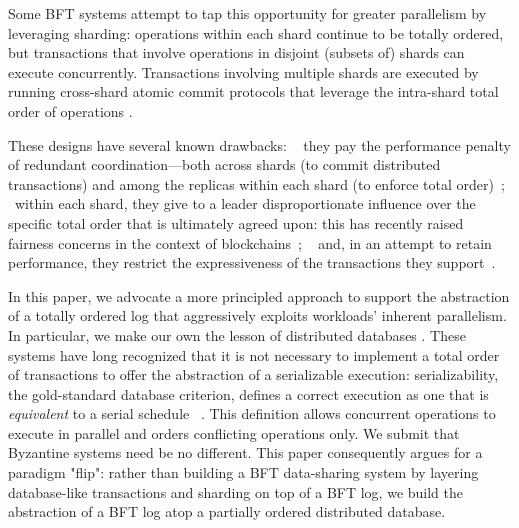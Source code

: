 Some BFT systems attempt to tap this opportunity for greater parallelism by leveraging sharding: operations within each shard continue to be totally ordered, but transactions that involve operations in disjoint (subsets of) shards can execute concurrently. Transactions involving  multiple shards are executed by running cross-shard atomic commit protocols that leverage the intra-shard total order of operations \cite{kokoris2018omniledger, al2017chainspace, zamani2018rapidchain, padilha2013augustus, padilha2016callinicos}. 

These designs have several known drawbacks: \one~ they pay the performance penalty of  redundant coordination---both across shards (to commit distributed transactions) and among the replicas within each shard (to enforce total order)~\cite{zhang2016operation, zhang2015tapir, mu2016consolidating}; \two~within each shard,  they give to a leader disproportionate influence over the specific total order that is ultimately agreed upon: this has recently raised fairness concerns in the context of blockchains~\cite{herlihy2016enhancing, yin2019hotstuff}; \three~ and, in an attempt to retain performance, they restrict the expressiveness of the transactions they support~\cite{padilha2013augustus, padilha2016callinicos}. 

In this paper, we advocate a more principled approach to support the abstraction of a totally ordered log that aggressively exploits workloads' inherent parallelism. In particular, we  make our own the lesson of distributed databases . These systems have long recognized that it is not necessary to implement a total order of transactions to offer the abstraction of a serializable execution: serializability, the gold-standard database criterion, defines a correct execution as one that is \textit{equivalent} to a serial schedule ~\cite{bernstein1979fas,Papadimitriou1979serializability,bernstein1979fas}.  This definition allows concurrent operations to execute in parallel and orders conflicting operations only.  We submit that Byzantine systems need be no different. This paper consequently argues for a paradigm "flip": rather than building a BFT data-sharing system by layering database-like transactions and sharding on top of a BFT log, we build the abstraction of a BFT log atop a partially ordered distributed database.


\iffalse

